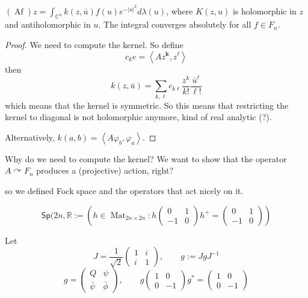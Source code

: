 \medskip{}
$(\operatorname{Af})z=\int_{\mathbb{C}^{n}}
k(z,\bar{u})f(u)e^{-|u|^2}
d \lambda(u)$, where $K(z,u)$ is holomorphic
in  $z$ and antiholomorphic in $u$. The
integral converges absolutely for all $f \in
F_n$.

\begin{proof}
We need to compute the kernel. So define
$$c_ke=\left\langle{} Az^{\mathbf{k}},z^\ell
\right\rangle{}$$
then
$$k(z,\bar{u}
)=\sum_{k,\ell}c_{k\ell}\frac{z^k}{k!}
\frac{\bar{u}
^\ell}{\ell!}$$
which means that the kernel is symmetric. So
this means that restricting the kernel to
diagonal is not holomorphic anymore, kind of
real analytic (?).

Alternatively, $k(a,b)=\left\langle{}
A\varphi_b,\varphi_a \right\rangle{}$.
\end{proof}

\medskip{}
Why do we need to compute the kernel? We want
to show that the operator $A\curvearrowright
F_n$ produces a (projective) action, right?

\medskip{}
so we defined Fock space and the operators
that act nicely on it.

\medskip{}

\begin{definition}
\label{definition-erdnigor-sp}
$$\mathsf{Sp}(2n,\mathbb{R}:=\left(
h\in\operatorname{Mat}_{2n\times 2n}:h
\begin{pmatrix} 0&1\\-1&0
\end{pmatrix}h^+=\begin{pmatrix} 0&1\\-1&0
\end{pmatrix}   \right)$$
\end{definition}

Let
$$J=\frac{1}{\sqrt{2} }\begin{pmatrix}
1&i\\i&1 \end{pmatrix} , \qquad g:=Jg
J^{-1}$$
$$g=\begin{pmatrix} Q&\psi\\\bar{\psi}
&\bar{\phi}  \end{pmatrix} ,\qquad g
\begin{pmatrix} 1&0\\0&-1 \end{pmatrix} g^*
=\begin{pmatrix} 1&0\\0&-1 \end{pmatrix}$$

